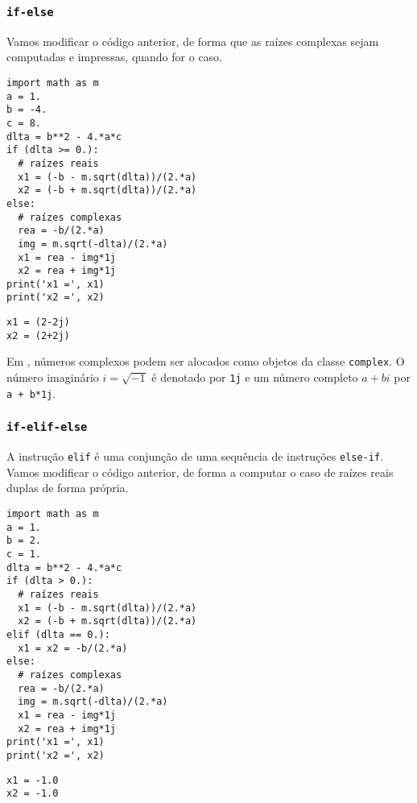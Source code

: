 \subsubsection{\texttt{if-else}}

Vamos modificar o código anterior, de forma que as raízes complexas sejam computadas e impressas, quando for o caso.

\begin{lstlisting}
import math as m
a = 1.
b = -4.
c = 8.
dlta = b**2 - 4.*a*c
if (dlta >= 0.):
  # raízes reais
  x1 = (-b - m.sqrt(dlta))/(2.*a)
  x2 = (-b + m.sqrt(dlta))/(2.*a)
else:
  # raízes complexas
  rea = -b/(2.*a)
  img = m.sqrt(-dlta)/(2.*a)
  x1 = rea - img*1j
  x2 = rea + img*1j
print('x1 =', x1)
print('x2 =', x2)
\end{lstlisting}

\begin{verbatim}
x1 = (2-2j)
x2 = (2+2j)
\end{verbatim}

\begin{obs}
  Em {\python}, números complexos podem ser alocados como objetos da classe \texttt{complex}. O número imaginário $i = \sqrt{-1}$ é denotado por \texttt{1j} e um número completo $a + bi$ por \texttt{a + b*1j}.
\end{obs}

\subsubsection{\texttt{if-elif-else}}

A instrução \texttt{elif} é uma conjunção de uma sequência de instruções \texttt{else-if}. Vamos modificar o código anterior, de forma a computar o caso de raízes reais duplas de forma própria.

\begin{lstlisting}
import math as m
a = 1.
b = 2.
c = 1.
dlta = b**2 - 4.*a*c
if (dlta > 0.):
  # raízes reais
  x1 = (-b - m.sqrt(dlta))/(2.*a)
  x2 = (-b + m.sqrt(dlta))/(2.*a)
elif (dlta == 0.):
  x1 = x2 = -b/(2.*a)
else:
  # raízes complexas
  rea = -b/(2.*a)
  img = m.sqrt(-dlta)/(2.*a)
  x1 = rea - img*1j
  x2 = rea + img*1j
print('x1 =', x1)
print('x2 =', x2)
\end{lstlisting}

\begin{verbatim}
x1 = -1.0
x2 = -1.0
\end{verbatim}

